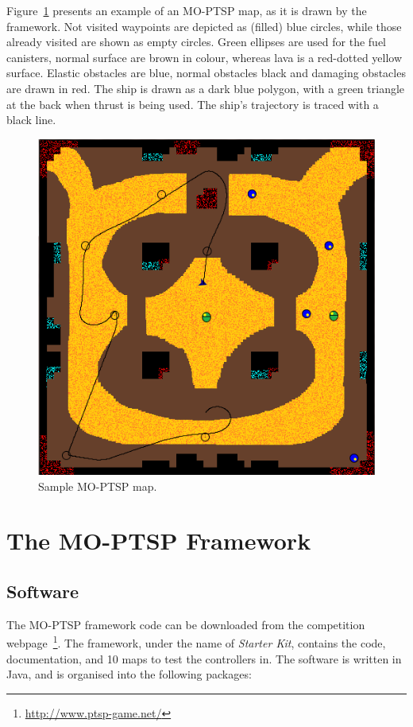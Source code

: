 \documentclass[conference]{IEEEtran}
\begin{document}
Figure~\ref{fig:sampleMap} presents an example of an MO-PTSP map, as it is drawn by the framework. Not visited waypoints are depicted as (filled) blue circles, while those already visited are shown as empty circles. Green ellipses are used for the fuel canisters,  normal surface are brown in colour, whereas lava is a red-dotted yellow surface. Elastic obstacles are blue, normal obstacles black and damaging obstacles are drawn in red. The ship is drawn as a dark blue polygon, with a green triangle at the back when thrust is being used. The ship's trajectory is traced with a black line.

\begin{figure} [!h]
	\begin{center}
	\includegraphics[width=0.7\columnwidth]{img/sampleMap}
	\caption{Sample MO-PTSP map.}
	\label{fig:sampleMap}
	\end{center}
\end{figure}


\section{The MO-PTSP Framework} \label{sec:contr}


\subsection{Software} \label{ssec:software}

The MO-PTSP framework code can be downloaded from the competition webpage~\footnote{\url{http://www.ptsp-game.net/}}. The framework, under the name of \textit{Starter Kit}, contains the code, documentation, and 10 maps to test the controllers in. The software is written in Java, and is organised into the following packages:
\end{document}
